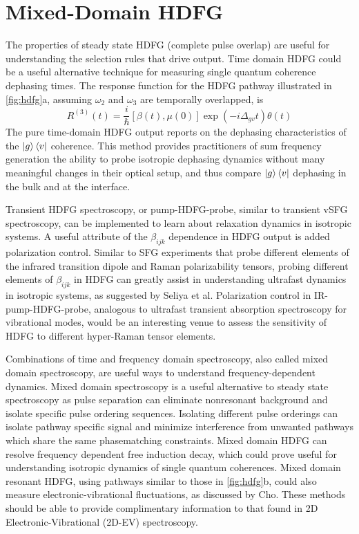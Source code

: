 \documentclass[aip, jcp, reprint, onecolumn]{revtex4-2}
\begin{document}
\section{Mixed-Domain HDFG}\label{mixeddomain}
The properties of steady state HDFG (complete pulse overlap) are useful for understanding the selection rules that drive output.
Time domain HDFG could be a useful alternative technique for measuring single quantum coherence dephasing times.
The response function for the HDFG pathway illustrated in \autoref{fig:hdfg}a, assuming $\omega_2$ and $\omega_3$ are temporally overlapped, is \cite{RN287, Cho2001}
\begin{equation}
	R^{(3)}(t) = \frac{i}{\hbar} [\beta(t), \mu(0)] \exp(-i\Delta_{gv}t) \theta(t) 
\end{equation}  
The pure time-domain HDFG output reports on the dephasing characteristics of the $\ket{g}\bra{v}$ coherence. 
This method provides practitioners of sum frequency generation the ability to probe isotropic dephasing dynamics without many meaningful changes in their optical setup, and thus compare $\ket{g}\bra{v}$ dephasing in the bulk and at the interface.\cite{RN224}

Transient HDFG spectroscopy, or pump-HDFG-probe, similar to transient vSFG spectroscopy, can be implemented to learn about relaxation dynamics in isotropic systems. \cite{RN224, Bonn2024}
A useful attribute of the $\beta_{ijk}$ dependence in HDFG output is added polarization control. 
Similar to SFG experiments that probe different elements of the infrared transition dipole and Raman polarizability tensors, probing different elements of $\beta_{ijk}$ in HDFG can greatly assist in understanding ultrafast dynamics in isotropic systems, as suggested by Seliya et al. \cite{Shen90, RN224, Bonn2024}
Polarization control in IR-pump-HDFG-probe, analogous to ultrafast transient absorption spectroscopy for vibrational modes, would be an interesting venue to assess the sensitivity of HDFG to different hyper-Raman tensor elements. 

Combinations of time and frequency domain spectroscopy, also called mixed domain spectroscopy, are useful ways to understand frequency-dependent dynamics. \cite{RN135, RN171, RN131}
Mixed domain spectroscopy is a useful alternative to steady state spectroscopy as pulse separation can eliminate nonresonant background and isolate specific pulse ordering sequences. \cite{RN372, RN324, McDonnell2024}
Isolating different pulse orderings can isolate pathway specific signal and minimize interference from unwanted pathways which share the same phasematching constraints. 
Mixed domain HDFG can resolve frequency dependent free induction decay, which could prove useful for understanding isotropic dynamics of single quantum coherences. 
Mixed domain resonant HDFG, using pathways similar to those in \autoref{fig:hdfg}b, could also measure electronic-vibrational fluctuations, as discussed by Cho. \cite{Cho2001}
These methods should be able to provide complimentary information to that found in 2D Electronic-Vibrational (2D-EV) spectroscopy. \cite{Dong2015, Lewis2015, Gaynor2017}
\end{document}
